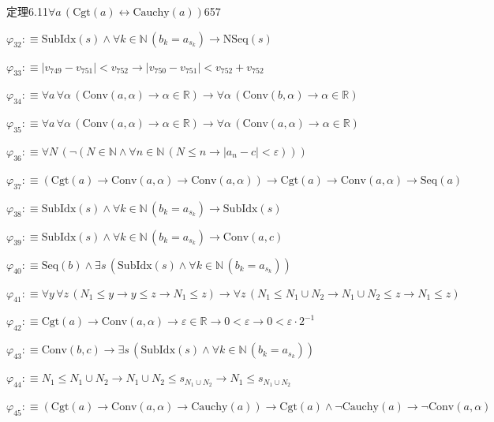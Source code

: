 \begin{fullproof}{定理6.11}{$\forall a\,(\mathrm{Cgt}(a) \leftrightarrow \mathrm{Cauchy}(a))$}{657}
\begin{abbrevlist}
\item $\varphi_{32} :\equiv \mathrm{SubIdx}(s) \land \forall k \in \mathbb{N}\,(b_{k} = a_{s_{k}}) \to \mathrm{NSeq}(s)$
\item $\varphi_{33} :\equiv \lvert v_{749} - v_{751} \rvert < v_{752} \to \lvert v_{750} - v_{751} \rvert < v_{752} + v_{752}$
\item $\varphi_{34} :\equiv \forall a\,\forall \alpha\,(\mathrm{Conv}(a,\alpha) \to \alpha \in \mathbb{R}) \to \forall \alpha\,(\mathrm{Conv}(b,\alpha) \to \alpha \in \mathbb{R})$
\item $\varphi_{35} :\equiv \forall a\,\forall \alpha\,(\mathrm{Conv}(a,\alpha) \to \alpha \in \mathbb{R}) \to \forall \alpha\,(\mathrm{Conv}(a,\alpha) \to \alpha \in \mathbb{R})$
\item $\varphi_{36} :\equiv \forall N\,(\neg (N \in \mathbb{N} \land \forall n \in \mathbb{N}\,(N \leq n \to \lvert a_{n} - c \rvert < \varepsilon)))$
\item $\varphi_{37} :\equiv (\mathrm{Cgt}(a) \to \mathrm{Conv}(a,\alpha) \to \mathrm{Conv}(a,\alpha)) \to \mathrm{Cgt}(a) \to \mathrm{Conv}(a,\alpha) \to \mathrm{Seq}(a)$
\item $\varphi_{38} :\equiv \mathrm{SubIdx}(s) \land \forall k \in \mathbb{N}\,(b_{k} = a_{s_{k}}) \to \mathrm{SubIdx}(s)$
\item $\varphi_{39} :\equiv \mathrm{SubIdx}(s) \land \forall k \in \mathbb{N}\,(b_{k} = a_{s_{k}}) \to \mathrm{Conv}(a,c)$
\item $\varphi_{40} :\equiv \mathrm{Seq}(b) \land \exists s\,(\mathrm{SubIdx}(s) \land \forall k \in \mathbb{N}\,(b_{k} = a_{s_{k}}))$
\item $\varphi_{41} :\equiv \forall y\,\forall z\,(N_{1} \leq y \to y \leq z \to N_{1} \leq z) \to \forall z\,(N_{1} \leq N_{1} \cup N_{2} \to N_{1} \cup N_{2} \leq z \to N_{1} \leq z)$
\item $\varphi_{42} :\equiv \mathrm{Cgt}(a) \to \mathrm{Conv}(a,\alpha) \to \varepsilon \in \mathbb{R} \to 0 < \varepsilon \to 0 < \varepsilon \cdot 2^{-1}$
\item $\varphi_{43} :\equiv \mathrm{Conv}(b,c) \to \exists s\,(\mathrm{SubIdx}(s) \land \forall k \in \mathbb{N}\,(b_{k} = a_{s_{k}}))$
\item $\varphi_{44} :\equiv N_{1} \leq N_{1} \cup N_{2} \to N_{1} \cup N_{2} \leq s_{N_{1} \cup N_{2}} \to N_{1} \leq s_{N_{1} \cup N_{2}}$
\item $\varphi_{45} :\equiv (\mathrm{Cgt}(a) \to \mathrm{Conv}(a,\alpha) \to \mathrm{Cauchy}(a)) \to \mathrm{Cgt}(a) \land \neg \mathrm{Cauchy}(a) \to \neg \mathrm{Conv}(a,\alpha)$

\end{abbrevlist}
\end{fullproof}
